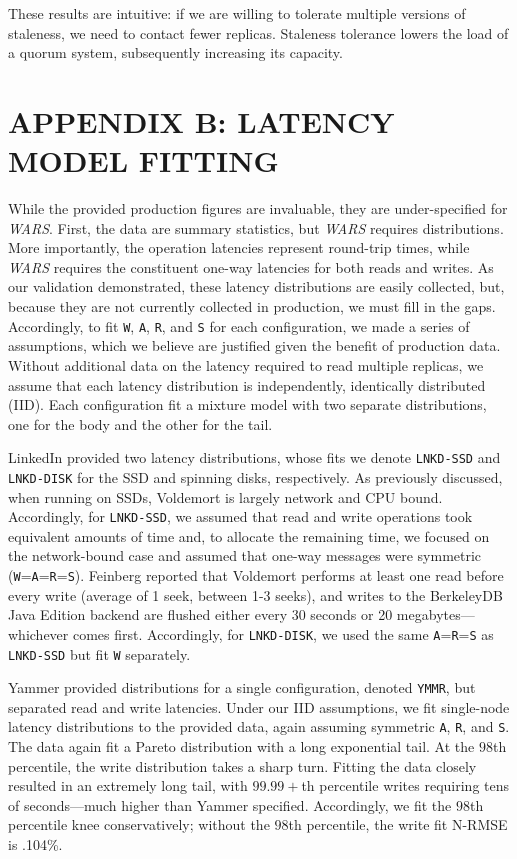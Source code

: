 \documentclass{vldb}
\begin{document}
These results are intuitive: if we are willing to tolerate multiple
versions of staleness, we need to contact fewer replicas.  Staleness
tolerance lowers the load of a quorum system, subsequently increasing
its capacity.


\section*{APPENDIX B: LATENCY MODEL FITTING}

While the provided production figures are invaluable, they are
under-specified for \textit{WARS}.  First, the data are summary
statistics, but \textit{WARS} requires distributions.  More
importantly, the operation latencies represent round-trip times, while
\textit{WARS} requires the constituent one-way latencies for both
reads and writes.  As our validation demonstrated, these latency
distributions are easily collected, but, because they are not
currently collected in production, we must fill in the
gaps. Accordingly, to fit \texttt{W}, \texttt{A}, \texttt{R}, and
\texttt{S} for each configuration, we made a series of assumptions,
which we believe are justified given the benefit of production data.
Without additional data on the latency required to read multiple
replicas, we assume that each latency distribution is independently,
identically distributed (IID).  Each configuration fit a mixture model
with two separate distributions, one for the body and the other for
the tail.

LinkedIn provided two latency distributions, whose fits we denote
\texttt{LNKD-SSD} and \texttt{LNKD-DISK} for the SSD and spinning
disks, respectively.  As previously discussed, when running on SSDs,
Voldemort is largely network and CPU bound.  Accordingly, for
\texttt{LNKD-SSD}, we assumed that read and write operations took
equivalent amounts of time and, to allocate the remaining time, we
focused on the network-bound case and assumed that one-way messages
were symmetric (\texttt{W}=\texttt{A}=\texttt{R}=\texttt{S}). Feinberg
reported that Voldemort performs at least one read before every write
(average of 1 seek, between 1-3 seeks), and writes to the BerkeleyDB
Java Edition backend are flushed either every 30 seconds or 20
megabytes---whichever comes first.  Accordingly, for
\texttt{LNKD-DISK}, we used the same \texttt{A}=\texttt{R}=\texttt{S}
as \texttt{LNKD-SSD} but fit \texttt{W} separately.

Yammer provided distributions for a single configuration, denoted
\texttt{YMMR}, but separated read and write latencies.  Under our IID
assumptions, we fit single-node latency distributions to the provided
data, again assuming symmetric \texttt{A}, \texttt{R}, and \texttt{S}.
The data again fit a Pareto distribution with a long exponential tail.
At the $98$th percentile, the write distribution takes a sharp turn.
Fitting the data closely resulted in an extremely long tail, with
$99.99+$th percentile writes requiring tens of seconds---much higher
than Yammer specified.  Accordingly, we fit the $98$th percentile knee
conservatively; without the $98$th percentile, the write fit N-RMSE is
.104\%.
\end{document}
